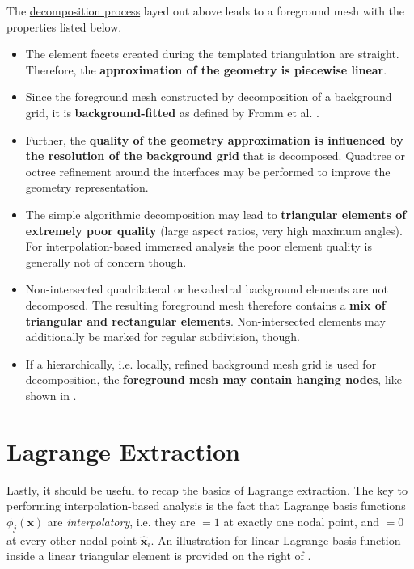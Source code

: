 \vspace{0.5cm}

The \hyperlink{decomposition}{decomposition process} layed out above leads to a foreground mesh with the \hypertarget{foreground_mesh_properties}{properties} listed below.
\begin{itemize}
    \item The element facets created during the templated triangulation are straight. Therefore, the \textbf{approximation of the geometry is piecewise linear}.
    
    \item Since the foreground mesh constructed by decomposition of a background grid, it is \textbf{background-fitted} as defined by Fromm et al. \cite{Fromm2022}.
    
    \item Further, the \textbf{quality of the geometry approximation is influenced by the resolution of the background grid} that is decomposed. Quadtree or octree refinement around the interfaces may be performed to improve the geometry representation.
    
    \item The simple algorithmic decomposition may lead to \textbf{triangular elements of extremely poor quality} (large aspect ratios, very high maximum angles). For interpolation-based immersed analysis the poor element quality is generally not of concern though.

    \item Non-intersected quadrilateral or hexahedral background elements are not decomposed. The resulting foreground mesh therefore contains a \textbf{mix of triangular and rectangular elements}. Non-intersected elements may additionally be marked for regular subdivision, though.

    \item If a hierarchically, i.e. locally, refined background mesh grid is used for decomposition, the \textbf{foreground mesh may contain hanging nodes}, like shown in .
\end{itemize}

\newpage
\section{Lagrange Extraction}
\label{sec:overview_extraction}

Lastly, it should be useful to recap the basics of Lagrange extraction. 
The key to performing interpolation-based analysis is the fact that Lagrange basis functions $\phi_j(\bm{x})$ are \emph{interpolatory}, i.e. they are $=1$ at exactly one nodal point, and $=0$ at every other nodal point $\hat{\bm{x}}_i$. An illustration for linear Lagrange basis function inside a linear triangular element is provided on the right of .

